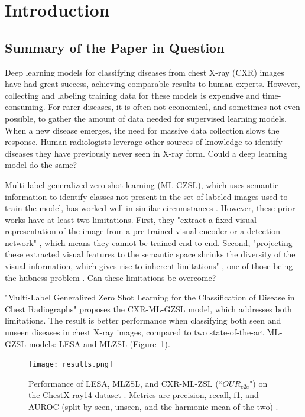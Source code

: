 \documentclass[letterpaper]{article} %
\begin{document}
\section{Introduction}

\subsection{Summary of the Paper in Question}

Deep learning models for classifying diseases from chest X-ray (CXR) images have had great success, achieving comparable results to human experts. However, collecting and labeling training data for these models is expensive and time-consuming. For rarer diseases, it is often not economical, and sometimes not even possible, to gather the amount of data needed for supervised learning models. When a new disease emerges, the need for massive data collection slows the response. Human radiologists leverage other sources of knowledge to identify diseases they have previously never seen in X-ray form. Could a deep learning model do the same?

Multi-label generalized zero shot learning (ML-GZSL), which uses semantic information to identify classes not present in the set of labeled images used to train the model, has worked well in similar circumstances \cite{10.1109/TPAMI.2012.256, 10.1109/TMM.2019.2924511, 9157745}. However, these prior works have at least two limitations. First, they "extract a fixed visual representation of the image from a pre-trained visual encoder or a detection network" \cite{hayat2021multilabel}, which means they cannot be trained end-to-end. Second, "projecting these extracted visual features to the semantic space shrinks the diversity of the visual information, which gives rise to inherent limitations" \cite{hayat2021multilabel}, one of those being the hubness problem \cite{dinu2015improvingzeroshotlearningmitigating}. Can these limitations be overcome?

"Multi-Label Generalized Zero Shot Learning for the Classification of Disease in Chest Radiographs" \cite{hayat2021multilabel} proposes the CXR-ML-GZSL model, which addresses both limitations. The result is better performance when classifying both seen and unseen diseases in chest X-ray images, compared to two state-of-the-art ML-GZSL models: LESA \cite{9157745} and MLZSL \cite{lee2018multilabelzeroshotlearningstructured} (Figure~\ref{fig:results}).

\begin{figure}[h!]
\centering
\texttt{[image: results.png]}
\caption{Performance of LESA, MLZSL, and CXR-ML-ZSL (``$OUR_{e2e}$") on the ChestX-ray14 dataset \cite{Wang_2017}. Metrics are precision, recall, f1, and AUROC (split by seen, unseen, and the harmonic mean of the two) \cite{hayat2021multilabel}.}
\label{fig:results}
\end{figure}
\end{document}
